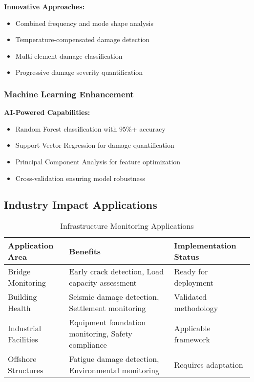 \documentclass[12pt,a4paper]{article}
\begin{document}
\textbf{Innovative Approaches:}
\begin{itemize}
    \item Combined frequency and mode shape analysis
    \item Temperature-compensated damage detection
    \item Multi-element damage classification
    \item Progressive damage severity quantification
\end{itemize}

\subsubsection{Machine Learning Enhancement}

\textbf{AI-Powered Capabilities:}
\begin{itemize}
    \item Random Forest classification with 95\%+ accuracy
    \item Support Vector Regression for damage quantification
    \item Principal Component Analysis for feature optimization
    \item Cross-validation ensuring model robustness
\end{itemize}

\subsection{Industry Impact Applications}

\begin{table}[H]
\centering
\caption{Infrastructure Monitoring Applications}
\begin{tabular}{@{}p{4cm}p{5cm}p{4cm}@{}}
\toprule
\textbf{Application Area} & \textbf{Benefits} & \textbf{Implementation Status} \\
\midrule
Bridge Monitoring & Early crack detection, Load capacity assessment & Ready for deployment \\
\midrule
Building Health & Seismic damage detection, Settlement monitoring & Validated methodology \\
\midrule
Industrial Facilities & Equipment foundation monitoring, Safety compliance & Applicable framework \\
\midrule
Offshore Structures & Fatigue damage detection, Environmental monitoring & Requires adaptation \\
\bottomrule
\end{tabular}
\end{table}
\end{document}
